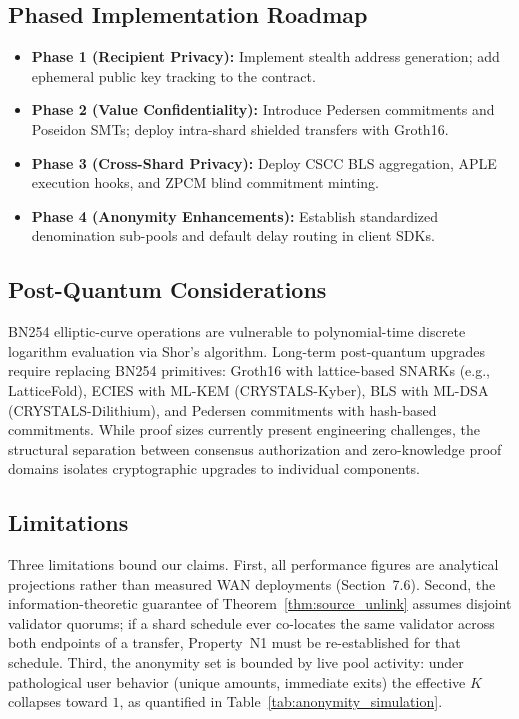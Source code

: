 \documentclass[sigconf,nonacm]{acmart}
\begin{document}
\subsection{Phased Implementation Roadmap}
\begin{itemize}
    \item \textbf{Phase 1 (Recipient Privacy):} Implement stealth address generation; add ephemeral public key tracking to the contract.
    \item \textbf{Phase 2 (Value Confidentiality):} Introduce Pedersen commitments and Poseidon SMTs; deploy intra-shard shielded transfers with Groth16.
    \item \textbf{Phase 3 (Cross-Shard Privacy):} Deploy CSCC BLS aggregation, APLE execution hooks, and ZPCM blind commitment minting.
    \item \textbf{Phase 4 (Anonymity Enhancements):} Establish standardized denomination sub-pools and default delay routing in client SDKs.
\end{itemize}

\subsection{Post-Quantum Considerations}
BN254 elliptic-curve operations are vulnerable to polynomial-time discrete logarithm evaluation via Shor's algorithm. Long-term post-quantum upgrades require replacing BN254 primitives: Groth16 with lattice-based SNARKs (e.g., LatticeFold), ECIES with ML-KEM (CRYSTALS-Kyber), BLS with ML-DSA (CRYSTALS-Dilithium), and Pedersen commitments with hash-based commitments. While proof sizes currently present engineering challenges, the structural separation between consensus authorization and zero-knowledge proof domains isolates cryptographic upgrades to individual components.

\subsection{Limitations}
Three limitations bound our claims. First, all performance figures are analytical projections rather than measured WAN deployments (Section~7.6). Second, the information-theoretic guarantee of Theorem~\ref{thm:source_unlink} assumes disjoint validator quorums; if a shard schedule ever co-locates the same validator across both endpoints of a transfer, Property~N1 must be re-established for that schedule. Third, the anonymity set is bounded by live pool activity: under pathological user behavior (unique amounts, immediate exits) the effective $K$ collapses toward $1$, as quantified in Table~\ref{tab:anonymity_simulation}.
\end{document}
